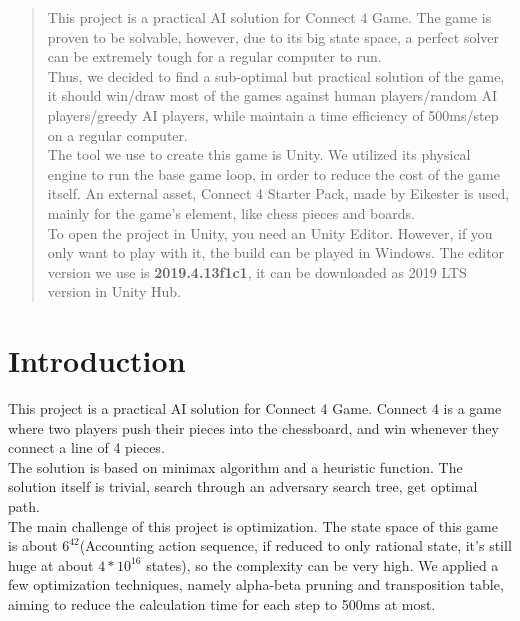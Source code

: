 \documentclass[12pt,a4paper]{article}
\begin{document}
	\begin{abstract}
		This project is a practical AI solution for Connect 4 Game. The game is proven to be solvable, however, due to its big state space, a perfect solver can be extremely tough for a regular computer to run.
		\\
		
		Thus, we decided to find a sub-optimal but practical solution of the game, it should win/draw most of the games against human players/random AI players/greedy AI players, while maintain a time efficiency of 500ms/step on a regular computer.
		\\
		
		The tool we use to create this game is Unity. We utilized its physical engine to run the base game loop, in order to reduce the cost of the game itself. An external asset, Connect 4 Starter Pack, made by Eikester is used, mainly for the game's element, like chess pieces and boards.\\
		
		To open the project in Unity, you need an Unity Editor. However, if you only want to play with it, the build can be played in Windows. The editor version we use is \textbf{2019.4.13f1c1},
		it can be downloaded as 2019 LTS version in Unity Hub.
		
	\end{abstract}
	
	
	\newpage
	
	\section{Introduction}
	This project is a practical AI solution for Connect 4 Game. Connect 4 is a game where two players push their pieces into the chessboard, and win whenever they connect a line of 4 pieces.
	\\
	
	The solution is based on minimax algorithm and a heuristic function. The solution itself is trivial, search through an adversary search tree, get optimal path.
	\\
	
	The main challenge of this project is optimization. The state space of this game is about $6^{42}$(Accounting action sequence, if reduced to only rational state, it's still huge at about $4*10^{16}$ states), so the complexity can be very high. We applied a few optimization techniques, namely alpha-beta pruning and transposition table, aiming to reduce the calculation time for each step to 500ms at most.
	\\
	
\end{document}

